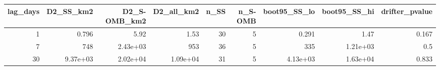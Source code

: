 \begin{tabular}{rrrrrrrrr}
\toprule
lag_days & D2_SS_km2 & D2_S-OMB_km2 & D2_all_km2 & n_SS & n_S-OMB & boot95_SS_lo & boot95_SS_hi & drifter_pvalue \\
\midrule
1 & 0.796 & 5.92 & 1.53 & 30 & 5 & 0.291 & 1.47 & 0.167 \\
7 & 748 & 2.43e+03 & 953 & 36 & 5 & 335 & 1.21e+03 & 0.5 \\
30 & 9.37e+03 & 2.02e+04 & 1.09e+04 & 31 & 5 & 4.13e+03 & 1.63e+04 & 0.833 \\
\bottomrule
\end{tabular}
